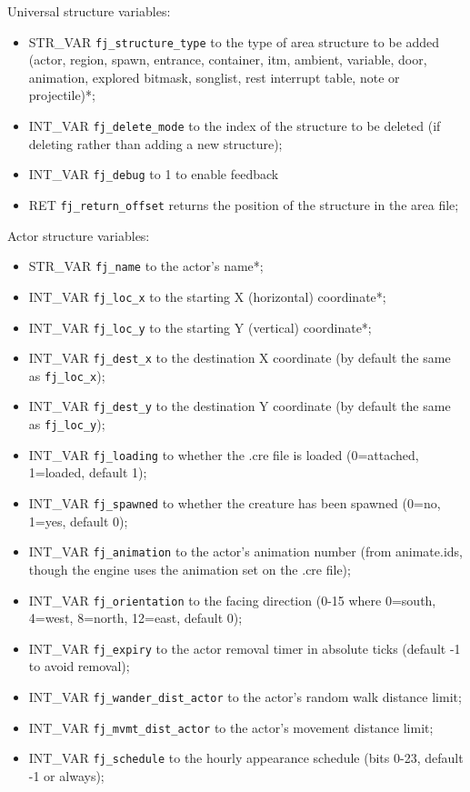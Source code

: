\documentclass{article}
\begin{document}
Universal structure variables:
\begin{itemize}
\item STR_VAR \verb+fj_structure_type+ to the type of area structure to be added (actor, region, spawn, entrance, container, itm, ambient, variable, door, animation, explored bitmask, songlist, rest interrupt table, note or projectile)*;
\item INT_VAR \verb+fj_delete_mode+ to the index of the structure to be deleted (if deleting rather than adding a new structure);
\item INT_VAR \verb+fj_debug+ to 1 to enable feedback
\item RET \verb+fj_return_offset+ returns the position of the structure in the area file;
\end{itemize}
Actor structure variables:
\begin{itemize}
\item STR_VAR \verb+fj_name+ to the actor's name*;
\item INT_VAR \verb+fj_loc_x+ to the starting X (horizontal) coordinate*;
\item INT_VAR \verb+fj_loc_y+ to the starting Y (vertical) coordinate*;
\item INT_VAR \verb+fj_dest_x+ to the destination X coordinate (by default the same as \verb+fj_loc_x+);
\item INT_VAR \verb+fj_dest_y+ to the destination Y coordinate (by default the same as \verb+fj_loc_y+);
\item INT_VAR \verb+fj_loading+ to whether the .cre file is loaded (0=attached, 1=loaded, default 1);
\item INT_VAR \verb+fj_spawned+ to whether the creature has been spawned (0=no, 1=yes, default 0);
\item INT_VAR \verb+fj_animation+ to the actor's animation number (from animate.ids, though the engine uses the animation set on the .cre file);
\item INT_VAR \verb+fj_orientation+ to the facing direction (0-15 where 0=south, 4=west, 8=north, 12=east, default 0);
\item INT_VAR \verb+fj_expiry+ to the actor removal timer in absolute ticks (default -1 to avoid removal);
\item INT_VAR \verb+fj_wander_dist_actor+ to the actor's random walk distance limit;
\item INT_VAR \verb+fj_mvmt_dist_actor+ to the actor's movement distance limit;
\item INT_VAR \verb+fj_schedule+ to the hourly appearance schedule (bits 0-23, default -1 or always);

\end{itemize}
\end{document}
